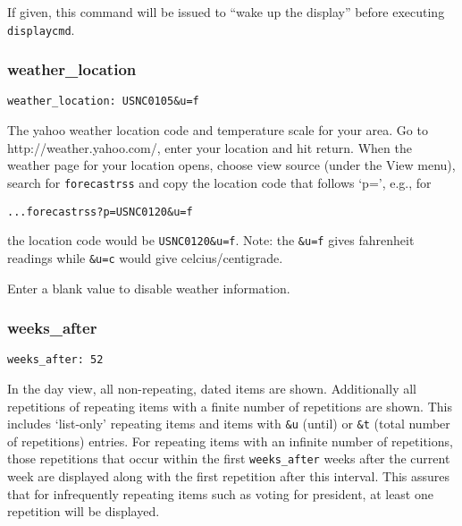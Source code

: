 \documentclass[]{article}
\begin{document}
If given, this command will be issued to ``wake up the display'' before
executing \texttt{displaycmd}.

\subsubsection{weather\_location}

\begin{verbatim}
weather_location: USNC0105&u=f
\end{verbatim}

The yahoo weather location code and temperature scale for your area. Go
to http://weather.yahoo.com/, enter your location and hit return. When
the weather page for your location opens, choose view source (under the
View menu), search for \texttt{forecastrss} and copy the location code
that follows `p=', e.g., for

\begin{verbatim}
...forecastrss?p=USNC0120&u=f
\end{verbatim}

the location code would be \texttt{USNC0120\&u=f}. Note: the
\texttt{\&u=f} gives fahrenheit readings while \texttt{\&u=c} would give
celcius/centigrade.

Enter a blank value to disable weather information.

\subsubsection{weeks\_after}

\begin{verbatim}
weeks_after: 52
\end{verbatim}

In the day view, all non-repeating, dated items are shown. Additionally
all repetitions of repeating items with a finite number of repetitions
are shown. This includes `list-only' repeating items and items with
\texttt{\&u} (until) or \texttt{\&t} (total number of repetitions)
entries. For repeating items with an infinite number of repetitions,
those repetitions that occur within the first \texttt{weeks\_after}
weeks after the current week are displayed along with the first
repetition after this interval. This assures that for infrequently
repeating items such as voting for president, at least one repetition
will be displayed.
\end{document}
